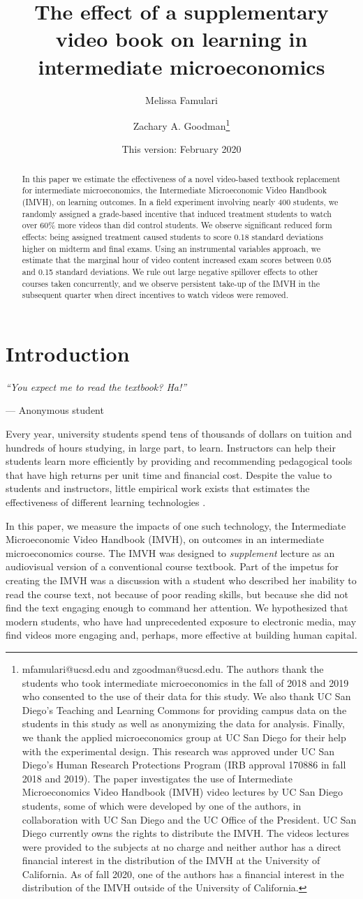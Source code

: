 \documentclass[12pt]{article}
\title{The effect of a supplementary video book on learning in intermediate microeconomics}
\author{Melissa Famulari}
\author{Zachary A. Goodman\thanks{mfamulari@ucsd.edu and zgoodman@ucsd.edu. The authors thank the students who took intermediate microeconomics in the fall of 2018 and 2019 who consented to the use of their data for this study. We also thank UC San Diego's Teaching and Learning Commons for providing campus data on the students in this study as well as anonymizing the data for analysis. Finally, we thank the applied microeconomics group at UC San Diego for their help with the experimental design. This research was approved under UC San Diego's Human Research Protections Program (IRB approval 170886 in fall 2018 and 2019). The paper investigates the use of Intermediate Microeconomics Video Handbook (IMVH) video lectures by UC San Diego students, some of which were developed by one of the authors, in collaboration with UC San Diego and the UC Office of the President. UC San Diego currently owns the rights to distribute the IMVH. The videos lectures were provided to the subjects at no charge and neither author has a direct financial interest in the distribution of the IMVH at the University of California. As of fall 2020, one of the authors has a financial interest in the distribution of the IMVH outside of the University of California.}}
\affil{University of California, San Diego}
\date{This version: February 2020} %
\begin{document}

\maketitle
\begin{abstract}
	In this paper we estimate the effectiveness of a novel video-based textbook replacement for intermediate microeconomics, the Intermediate Microeconomic Video Handbook (IMVH), on learning outcomes. In a field experiment involving nearly 400 students, we randomly assigned a grade-based incentive that induced treatment students to watch over 60\% more videos than did control students. We observe significant reduced form effects: being assigned treatment caused students to score 0.18 standard deviations higher on midterm and final exams. Using an instrumental variables approach, we estimate that the marginal hour of video content increased exam scores between 0.05 and 0.15 standard deviations. We rule out large negative spillover effects to other courses taken concurrently, and we observe persistent take-up of the IMVH in the subsequent quarter when direct incentives to watch videos were removed.
\end{abstract}


\section{Introduction}

\epigraph{\textit{``You expect me to read the textbook? Ha!''}}{--- Anonymous student}\bigskip

Every year, university students spend tens of thousands of dollars on tuition and hundreds of hours studying, in large part, to learn. Instructors can help their students learn more efficiently by providing and recommending pedagogical tools that have high returns per unit time and financial cost. Despite the value to students and instructors, little empirical work exists that estimates the effectiveness of different learning technologies \parencite{aws2015}.

In this paper, we measure the impacts of one such technology, the Intermediate Microeconomic Video Handbook (IMVH), on outcomes in an intermediate microeconomics course. The IMVH was designed to \textit{supplement} lecture as an audiovisual version of a conventional course textbook. Part of the impetus for creating the IMVH was a discussion with a student who described her inability to read the course text, not because of poor reading skills, but because she did not find the text engaging enough to command her attention. We hypothesized that modern students, who have had unprecedented exposure to electronic media, may find videos more engaging and, perhaps, more effective at building human capital.
\end{document}
